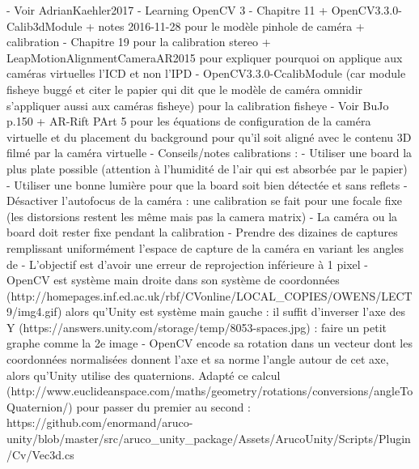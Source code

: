 - Voir AdrianKaehler2017 - Learning OpenCV 3 
    - Chapitre 11 + OpenCV3.3.0-Calib3dModule + notes 2016-11-28 pour le modèle pinhole de caméra + calibration
    - Chapitre 19 pour la calibration stereo + LeapMotionAlignmentCameraAR2015 pour expliquer pourquoi on applique aux caméras virtuelles l'ICD et non l'IPD
    - OpenCV3.3.0-CcalibModule (car module fisheye buggé et citer le papier qui dit que le modèle de caméra omnidir s'appliquer aussi aux caméras fisheye) pour la calibration fisheye
- Voir BuJo p.150 + AR-Rift PArt 5 pour les équations de configuration de la caméra virtuelle et du placement du background pour qu'il soit aligné avec le contenu 3D filmé par la caméra virtuelle
- Conseils/notes calibrations :
    - Utiliser une board la plus plate possible (attention à l'humidité de l'air qui est absorbée par le papier)
    - Utiliser une bonne lumière pour que la board soit bien détectée et sans reflets
    - Désactiver l'autofocus de la caméra : une calibration se fait pour une focale fixe (les distorsions restent les même mais pas la camera matrix)
    - La caméra ou la board doit rester fixe pendant la calibration
    - Prendre des dizaines de captures remplissant uniformément l'espace de capture de la caméra en variant les angles de 
    - L'objectif est d'avoir une erreur de reprojection inférieure à 1 pixel
    - OpenCV est système main droite dans son système de coordonnées (http://homepages.inf.ed.ac.uk/rbf/CVonline/LOCAL_COPIES/OWENS/LECT9/img4.gif) alors qu'Unity est système main gauche : il suffit d'inverser l'axe des Y (https://answers.unity.com/storage/temp/8053-spaces.jpg) : faire un petit graphe comme la 2e image
    - OpenCV encode sa rotation dans un vecteur dont les coordonnées normalisées donnent l'axe et sa norme l'angle autour de cet axe, alors qu'Unity utilise des quaternions. Adapté ce calcul (http://www.euclideanspace.com/maths/geometry/rotations/conversions/angleToQuaternion/) pour passer du premier au second : https://github.com/enormand/aruco-unity/blob/master/src/aruco_unity_package/Assets/ArucoUnity/Scripts/Plugin/Cv/Vec3d.cs